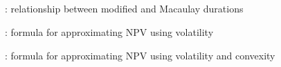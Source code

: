 \subsection*{}
\item {}: relationship between modified and Macaulay durations
\item {}: formula for approximating NPV using volatility
\item {}: formula for approximating NPV using volatility and convexity
